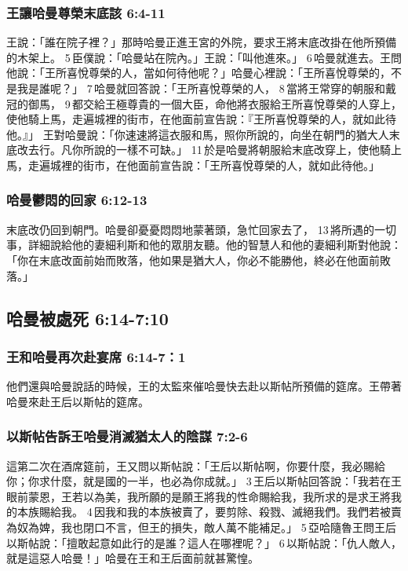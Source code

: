 \subsubsection{王讓哈曼尊榮末底該 6:4-11}
王說：「誰在院子裡？」那時哈曼正進王宮的外院，要求王將末底改掛在他所預備的木架上。 5 臣僕說：「哈曼站在院內。」王說：「叫他進來。」 6 哈曼就進去。王問他說：「王所喜悅尊榮的人，當如何待他呢？」哈曼心裡說：「王所喜悅尊榮的，不是我是誰呢？」 7 哈曼就回答說：「王所喜悅尊榮的人， 8 當將王常穿的朝服和戴冠的御馬， 9 都交給王極尊貴的一個大臣，命他將衣服給王所喜悅尊榮的人穿上，使他騎上馬，走遍城裡的街市，在他面前宣告說：『王所喜悅尊榮的人，就如此待他。』」
王對哈曼說：「你速速將這衣服和馬，照你所說的，向坐在朝門的猶大人末底改去行。凡你所說的一樣不可缺。」 11 於是哈曼將朝服給末底改穿上，使他騎上馬，走遍城裡的街市，在他面前宣告說：「王所喜悅尊榮的人，就如此待他。」

\subsubsection{哈曼鬱悶的回家 6:12-13}
末底改仍回到朝門。哈曼卻憂憂悶悶地蒙著頭，急忙回家去了， 13 將所遇的一切事，詳細說給他的妻細利斯和他的眾朋友聽。他的智慧人和他的妻細利斯對他說：「你在末底改面前始而敗落，他如果是猶大人，你必不能勝他，終必在他面前敗落。」

\subsection{哈曼被處死 6:14-7:10}
\subsubsection{王和哈曼再次赴宴席 6:14-7：1}
他們還與哈曼說話的時候，王的太監來催哈曼快去赴以斯帖所預備的筵席。王帶著哈曼來赴王后以斯帖的筵席。

\subsubsection{以斯帖告訴王哈曼消滅猶太人的陰謀 7:2-6}
這第二次在酒席筵前，王又問以斯帖說：「王后以斯帖啊，你要什麼，我必賜給你；你求什麼，就是國的一半，也必為你成就。」 3 王后以斯帖回答說：「我若在王眼前蒙恩，王若以為美，我所願的是願王將我的性命賜給我，我所求的是求王將我的本族賜給我。 4 因我和我的本族被賣了，要剪除、殺戮、滅絕我們。我們若被賣為奴為婢，我也閉口不言，但王的損失，敵人萬不能補足。」 5 亞哈隨魯王問王后以斯帖說：「擅敢起意如此行的是誰？這人在哪裡呢？」 6 以斯帖說：「仇人敵人，就是這惡人哈曼！」哈曼在王和王后面前就甚驚惶。

